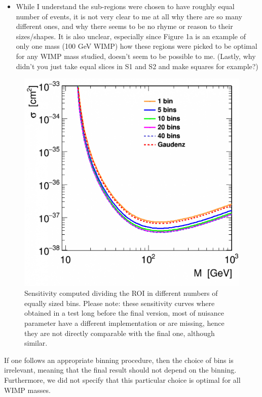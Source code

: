 \documentclass{article}
\begin{document}
\begin{itemize}
	\item {\color{blue} 
While I understand the sub-regions were chosen to have roughly equal
number of events, it is not very clear to me at all why there are so
many different ones, and why there seems to be no rhyme or reason to
their sizes/shapes. It is also unclear, especially since Figure 1a is
an example of only one mass (100 GeV WIMP) how these regions were
picked to be optimal for any WIMP mass studied, doesn’t seem to be
possible to me. (Lastly, why didn’t you just take equal slices in S1
and S2 and make squares for example?)}
\end{itemize}

\begin{figure}[t!]
  \centerline{\includegraphics[width=0.7\linewidth]{inelastic_binning_check.png}}
  \caption{ Sensitivity computed dividing the ROI in different numbers of equally sized bins. Please note: these sensitivity curves where obtained in a test long before the final version, most of nuisance parameter have  a different implementation or are missing, hence they are not directly comparable with the final one, although similar.}
  \label{fig:binning}
\end{figure}

If one follows an appropriate binning procedure, then the choice of bins is irrelevant, meaning that 
the final result should not depend on the binning. Furthermore, we did not specify that this particular 
choice is optimal for all WIMP masses.
\end{document}
